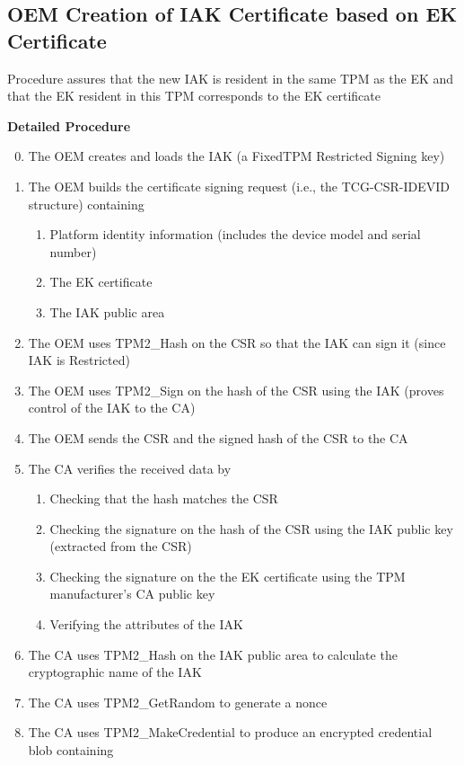 \documentclass{article}
\begin{document}
\subsection*{OEM Creation of IAK Certificate based on EK Certificate}

Procedure assures that the new IAK is resident in the same TPM as the EK and that the EK resident in this TPM corresponds to the EK certificate
\bigskip

\textbf{Detailed Procedure}
\begin{enumerate}
    \setcounter{enumi}{-1}
    \item The OEM creates and loads the IAK (a FixedTPM Restricted Signing key)
    \item The OEM builds the certificate signing request (i.e., the TCG-CSR-IDEVID structure) containing
    \begin{enumerate}
        \item Platform identity information (includes the device model and serial number)
        \item The EK certificate
        \item The IAK public area
    \end{enumerate}
    \item The OEM uses TPM2\_Hash on the CSR so that the IAK can sign it (since IAK is Restricted)
    \item The OEM uses TPM2\_Sign on the hash of the CSR using the IAK (proves control of the IAK to the CA)
    \item The OEM sends the CSR and the signed hash of the CSR to the CA
    \item The CA verifies the received data by
    \begin{enumerate}
        \item Checking that the hash matches the CSR
        \item Checking the signature on the hash of the CSR using the IAK public key (extracted from the CSR)
        \item Checking the signature on the the EK certificate using the TPM manufacturer's CA public key
        \item Verifying the attributes of the IAK
    \end{enumerate}
    \item The CA uses TPM2\_Hash on the IAK public area to calculate the cryptographic name of the IAK
    \item The CA uses TPM2\_GetRandom to generate a nonce
    \item The CA uses TPM2\_MakeCredential to produce an encrypted credential blob containing

\end{enumerate}
\end{document}
